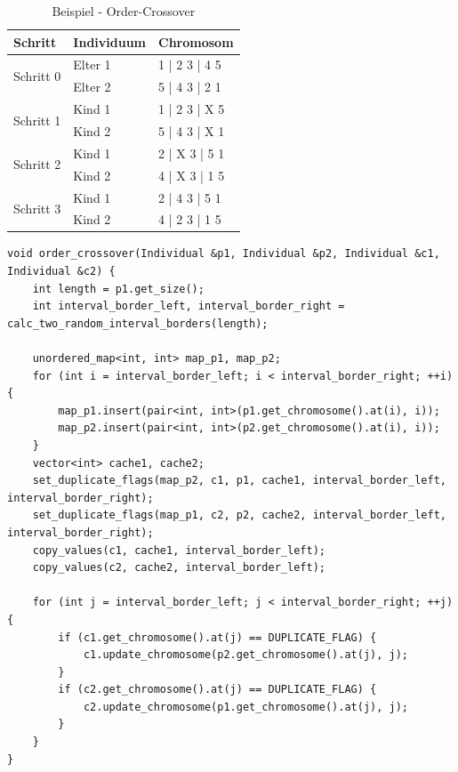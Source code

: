 \begin{table}[!htb]
\centering
\caption{Beispiel - Order-Crossover}
\begin{tabularx}{0.5\textwidth}{l|l|l}
Schritt & Individuum & Chromosom\\
\hline
\multirow{2}{*}{Schritt 0}
		& Elter 1 & 1 | 2 3 | 4 5\\
		& Elter 2 & 5 | 4 3 | 2 1\\
\hline
\multirow{2}{*}{Schritt 1}
		& Kind 1 & 1 | 2 3 | X 5\\
		& Kind 2 & 5 | 4 3 | X 1\\
\hline
\multirow{2}{*}{Schritt 2}
		& Kind 1 & 2 | X 3 | 5 1\\
		& Kind 2 & 4 | X 3 | 1 5\\
\hline
\multirow{2}{*}{Schritt 3}
		& Kind 1 & 2 | 4 3 | 5 1\\
		& Kind 2 & 4 | 2 3 | 1 5\\
\end{tabularx}
\label{tab:ox}
\end{table}


\begin{minipage}[!htb]{\linewidth}
\begin{lstlisting}[caption={Order-Crossover}, firstnumber=1, captionpos=b, label=lst:ox]
void order_crossover(Individual &p1, Individual &p2, Individual &c1, Individual &c2) {
	int length = p1.get_size();
	int interval_border_left, interval_border_right = calc_two_random_interval_borders(length);

	unordered_map<int, int> map_p1, map_p2;
	for (int i = interval_border_left; i < interval_border_right; ++i) {
		map_p1.insert(pair<int, int>(p1.get_chromosome().at(i), i));
		map_p2.insert(pair<int, int>(p2.get_chromosome().at(i), i));
	}
	vector<int> cache1, cache2;
	set_duplicate_flags(map_p2, c1, p1, cache1, interval_border_left, interval_border_right);
	set_duplicate_flags(map_p1, c2, p2, cache2, interval_border_left, interval_border_right);
	copy_values(c1, cache1, interval_border_left);
	copy_values(c2, cache2, interval_border_left);

	for (int j = interval_border_left; j < interval_border_right; ++j) {
		if (c1.get_chromosome().at(j) == DUPLICATE_FLAG) {
			c1.update_chromosome(p2.get_chromosome().at(j), j);
		}
		if (c2.get_chromosome().at(j) == DUPLICATE_FLAG) {
			c2.update_chromosome(p1.get_chromosome().at(j), j);
		}
	}
}
\end{lstlisting}
\end{minipage}

